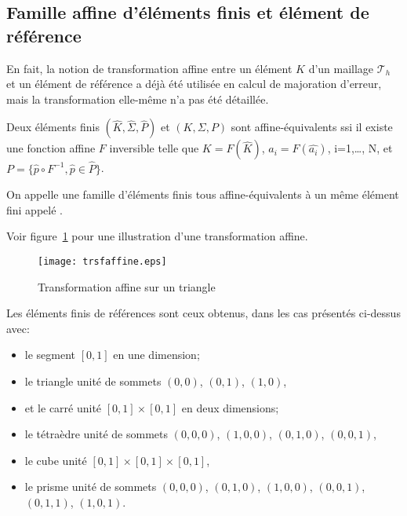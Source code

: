 \medskip
\subsection{Famille affine d'éléments finis et élément de référence}
En fait, la notion de transformation affine entre un élément $K$ d'un maillage
$\mathcal{T}_h$ et un élément de référence a déjà été utilisée en
calcul de majoration d'erreur, mais la transformation elle-même n'a pas été
détaillée.

\medskip{}
Deux éléments finis $(\hat{K}, \hat{\Sigma}, \hat{P})$ et $(K, \Sigma, P)$ sont
affine-équivalents ssi il existe une fonction affine $F$ inversible telle que
$K=F(\hat{K})$, $a_i=F(\hat{a_i})$, i=1,\ldots, N, et $P=\{\hat{p}\circ F^{-1}, \hat{p}\in\hat{P}\}$.
\normalsize

\medskip
\begin{definition}
On appelle  une famille d'éléments finis
tous affine-équivalents à un même élément fini appelé .
\end{definition}
\medskip
{}
Voir figure~\ref{trsfaffine} pour une illustration d'une transformation affine.
\begin{figure}[ht]
\centering
\texttt{[image: trsfaffine.eps]}
\caption{\label{trsfaffine} Transformation affine sur un triangle}
\end{figure}
\medskip
Les éléments finis de références sont ceux obtenus, dans les cas présentés ci-dessus avec:
\begin{itemize}
\item le segment $[0,1]$ en une dimension;
\item le triangle unité de sommets $(0,0)$, $(0,1)$, $(1,0)$,
\item et le carré unité $[0,1]\times[0,1]$ en deux dimensions;
\item le tétraèdre unité de sommets $(0,0,0)$, $(1,0,0)$, $(0,1,0)$, $(0,0,1)$,
\item le cube unité $[0,1]\times[0,1]\times[0,1]$,
\item le prisme unité de sommets $(0,0,0)$, $(0,1,0)$, $(1,0,0)$, $(0,0,1)$, $(0,1,1)$, $(1,0,1)$.
\end{itemize}

